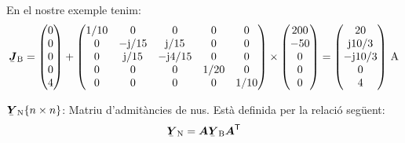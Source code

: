 \begin{list}{}
   En el nostre exemple tenim:
   \[
      \mcmplx{J}\ped{B} =
      \begin{pmatrix} 0 \\ 0 \\ 0 \\ 0 \\ 4 \end{pmatrix} +
       \begin{pmatrix}
            1/10 & 0 & 0 & 0 & 0 \\
            0 & -\ju/15 & \ju/15 & 0 & 0 \\
            0 & \ju/15 & -\ju 4/15 & 0 & 0 \\
            0 & 0 & 0 & 1/20 & 0 \\
            0 & 0 & 0 & 0 & 1/10
      \end{pmatrix} \times
      \begin{pmatrix} 200 \\ -50 \\ 0 \\ 0 \\ 0 \end{pmatrix} =
      \begin{pmatrix} 20 \\ \ju 10/3 \\ -\ju 10/3 \\ 0 \\ 4 \end{pmatrix}
     \unit{A}
   \]

   \item[$\mcmplx{Y}\ped{N}\{n\times n\}$:] Matriu d'admit\`{a}ncies de nus. Est\`{a} definida per la relaci\'{o} seg\"{u}ent:
   \begin{equation}
      \mcmplx{Y}\ped{N} = \boldsymbol{A} \mcmplx{Y}\ped{B}
      \transp{\boldsymbol{A}}
   \end{equation}


\end{list}
